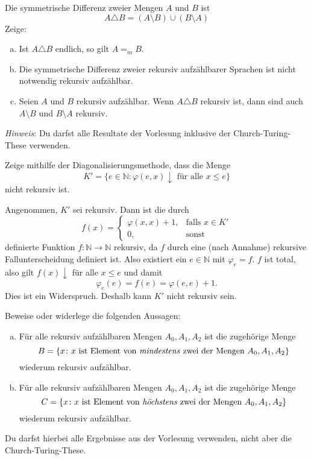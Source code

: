 \documentclass[german,headsepline]{scrartcl}
\theoremstyle{definition}
\begin{document}
	\begin{question}
		Die symmetrische Differenz zweier Mengen $A$ und $B$ ist
		\[A\triangle B=(A\setminus B)\cup(B\setminus A)\]
		Zeige:
		\begin{enumerate}[(a)]
			\item Ist $A\triangle B$ endlich, so gilt $A=_mB$.
			\item Die symmetrische Differenz zweier rekursiv aufzählbarer Sprachen ist nicht notwendig rekursiv aufzählbar.
			\item Seien $A$ und $B$ rekursiv aufzählbar.
			Wenn $A\triangle B$ rekursiv ist, dann sind auch $A\setminus B$ und $B\setminus A$ rekursiv.
		\end{enumerate}
		\textit{Hinweis}: Du darfst alle Resultate der Vorlesung inklusive der Church-Turing-These verwenden.
	\end{question}
	
	\begin{question}
		Zeige mithilfe der Diagonalisierungsmethode, dass die Menge
		\[K'=\{e\in\mathbb{N}\colon\varphi(e,x)\downarrow\text{ für alle }x\leq e\}\]
		nicht rekursiv ist.
	\end{question}
	\begin{solution}
		Angenommen, $K'$ sei rekursiv. Dann ist die durch
		\[f(x)=\begin{cases}
			\varphi(x,x)+1, &\text{falls }x\in K' \\
			0, &\text{sonst}
		\end{cases}\]
		definierte Funktion $f:\mathbb{N}\to\mathbb{N}$ rekursiv,
		da $f$ durch eine (nach Annahme) rekursive Fallunterscheidung definiert ist.
		Also existiert ein $e\in\mathbb{N}$ mit $\varphi_e=f$.
		$f$ ist total, also gilt $f(x)\downarrow$ für alle $x\leq e$ und damit
		\[\varphi_e(e)=f(e)=\varphi(e,e)+1.\]
		Dies ist ein Widerspruch. Deshalb kann $K'$ nicht rekursiv sein.
	\end{solution}
	
	\begin{question}[subtitle={Klausur 2015}]
		Beweise oder widerlege die folgenden Aussagen:
		\begin{enumerate}[(a)]
			\item Für alle rekursiv aufzählbaren Mengen $A_0,A_1,A_2$ ist die zugehörige Menge
				\[B=\{x\colon x\text{ ist Element von \emph{mindestens} zwei der Mengen }A_0,A_1,A_2\}\]
				wiederum rekursiv aufzählbar.
			\item Für alle rekursiv aufzählbaren Mengen $A_0,A_1,A_2$ ist die zugehörige Menge
				\[C=\{x\colon x\text{ ist Element von \emph{höchstens} zwei der Mengen }A_0,A_1,A_2\}\]
				wiederum rekursiv aufzählbar.
		\end{enumerate}
		Du darfst hierbei alle Ergebnisse aus der Vorlesung verwenden, nicht aber die Church-Turing-These.
	\end{question}
	
\end{document}

